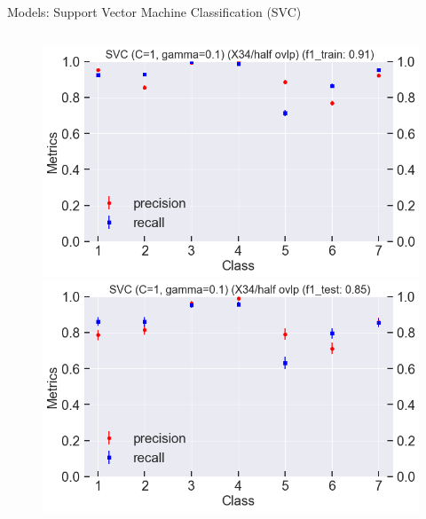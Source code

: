 \documentclass{if-beamer}
\begin{document}
\begin{frame}{Models:  Support Vector Machine Classification (SVC)}
\begin{columns}
\begin{column}{0.5\textwidth}
             \begin{figure}
            \includegraphics[scale=0.23]{./figs/svc_X34_half_train_score.png}
            \includegraphics[scale=0.23]{./figs/svc_X34_half_test_score.png}
            \end{figure}  
        
 \end{column}

 \end{columns}
   \end{frame}
\end{document}
